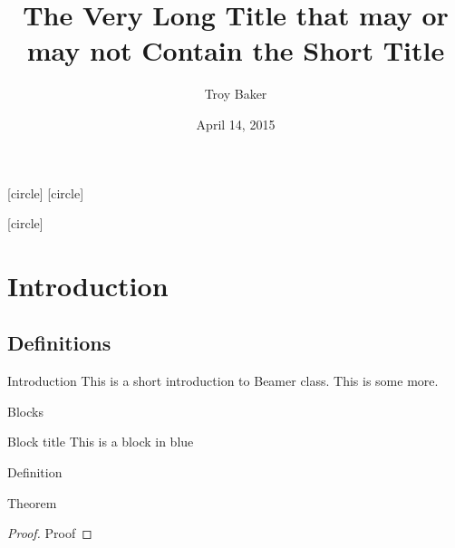 \documentclass{beamer}
\title[Short Title]{The Very Long Title that may or may not Contain the Short Title}
\author{Troy Baker}
\institute{University of Florida}
\date{April 14, 2015}
\begin{document}

\beamertemplatenavigationsymbolsempty

[circle]
[circle]

[circle]



\begin{frame}
    \titlepage
\end{frame}

\section{Introduction}
\subsection{Definitions}
\begin{frame}{Introduction}
    This is a short introduction to Beamer class.
    \pause
    This is some more.
\end{frame}


\begin{frame}{Blocks}
    \begin{block}{Block title}
        This is a block in blue
    \end{block}

    \begin{definition}
        Definition
    \end{definition}

    \begin{theorem}
        Theorem
    \end{theorem}

    \begin{proof}
        Proof
    \end{proof}
\end{frame}
\end{document}
